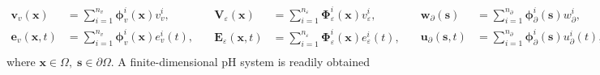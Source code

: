 	\begin{equation*}
	\begin{aligned}
	\bm{v}_v(\bm{x}) &= \sum_{i=1}^{n_v} \bm{\phi}_v^i(\bm{x}) v_v^i, \\
	\bm{e}_v(\bm{x},t) &= \sum_{i=1}^{n_v} \bm{\phi}_v^i(\bm{x}) {e}_v^i(t), \\
	\end{aligned} \quad
	\begin{aligned}
	\bm{V}_\varepsilon(\bm{x}) &= \sum_{i=1}^{n_\varepsilon} \bm{\Phi}_\varepsilon^i(\bm{x}) v_\varepsilon^i, \\
	\bm{E}_\varepsilon(\bm{x},t) &= \sum_{i=1}^{n_\varepsilon} \bm{\Phi}_\varepsilon^i(\bm{x}) {e}_\varepsilon^i(t), \\
	\end{aligned} \quad 
	\begin{aligned}
	\bm{w}_\partial(\bm{s}) &= \sum_{i=1}^{n_\partial} \bm{\phi}_\partial^i(\bm{s}) w_\partial^i, \\
	\bm{u}_\partial(\bm{s},t) &= \sum_{i=1}^{n_\partial} \bm{\phi}_\partial^i(\bm{s}) u_\partial^i(t), \\
	\end{aligned}
	\end{equation*}
	where $\bm{x} \in \Omega, \; \bm{s} \in \partial\Omega$. A finite-dimensional pH system is readily obtained
